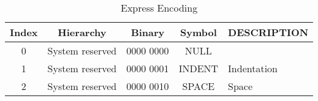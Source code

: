 \documentclass{article}
\begin{document}
\begin{table}[htbp]
\centering
\begin{tabular}{|c|c|c|c|l|}
\hline Index    & Hierarchy         & Binary        & Symbol & DESCRIPTION 
\\\hline 0      & System reserved   & 0000 0000     & NULL   & 
\\\hline 1      & System reserved   & 0000 0001     & INDENT & Indentation 
\\\hline 2      & System reserved   & 0000 0010     & SPACE  & Space


\\\hline
\end{tabular}
\caption{Express Encoding}
\end{table}
\end{document}
